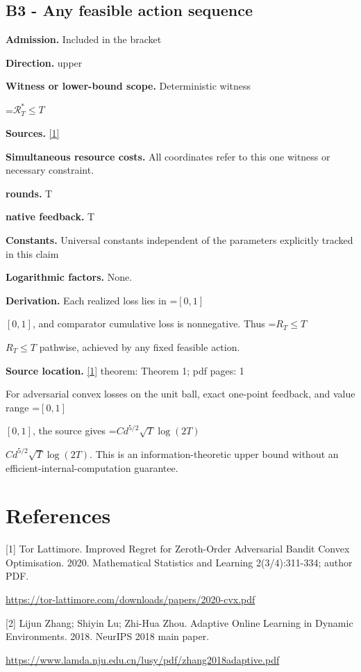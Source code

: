 \documentclass[10pt,a4paper]{article}
\newcommand{\AtlasMath}[1]{\par\begingroup\centering\setbox0=\hbox{$\displaystyle #1$}\ifdim\wd0>1.4\linewidth\typeout{ATLAS WIDE FORMULA: \the\wd0}\fi\ifdim\wd0>\linewidth\resizebox{\linewidth}{!}{\box0}\else\box0\fi\par\endgroup}
\newcommand{\AtlasInlineMath}[1]{\begingroup\setbox0=\hbox{$#1$}\ifdim\wd0>.4\linewidth\endgroup\AtlasMath{#1}\else\endgroup$#1$\fi}
\begin{document}
\subsection{B3 - Any feasible action sequence}
\textbf{Admission.} Included in the bracket

\textbf{Direction.} upper

\textbf{Witness or lower-bound scope.} Deterministic witness

\AtlasMath{\mathcal{R}_T^*\le T}
\textbf{Sources.} \href{https://tor-lattimore.com/downloads/papers/2020-cvx.pdf}{[1]}

\textbf{Simultaneous resource costs.} All coordinates refer to this one witness or necessary constraint.

\textbf{rounds.} T

\textbf{native feedback.} T

\textbf{Constants.} Universal constants independent of the parameters explicitly tracked in this claim

\textbf{Logarithmic factors.} None.

\textbf{Derivation.} Each realized loss lies in \AtlasInlineMath{[0,1]}, and comparator cumulative loss is nonnegative. Thus \AtlasInlineMath{R_T\le T} pathwise, achieved by any fixed feasible action.

\textbf{Source location.} \href{https://tor-lattimore.com/downloads/papers/2020-cvx.pdf}{[1]} theorem: Theorem 1; pdf pages: 1

For adversarial convex losses on the unit ball, exact one-point feedback, and value range \AtlasInlineMath{[0,1]}, the source gives \AtlasInlineMath{Cd^{5/2}\sqrt T\log(2T)}. This is an information-theoretic upper bound without an efficient-internal-computation guarantee.

\section{References}
[1] Tor Lattimore. Improved Regret for Zeroth-Order Adversarial Bandit Convex Optimisation. 2020. Mathematical Statistics and Learning 2(3/4):311-334; author PDF.

\url{https://tor-lattimore.com/downloads/papers/2020-cvx.pdf}

[2] Lijun Zhang; Shiyin Lu; Zhi-Hua Zhou. Adaptive Online Learning in Dynamic Environments. 2018. NeurIPS 2018 main paper.

\url{https://www.lamda.nju.edu.cn/lusy/pdf/zhang2018adaptive.pdf}
\end{document}
